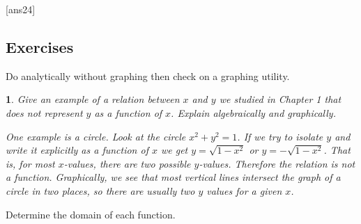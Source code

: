 \documentclass{amsbook}
\newtheorem{exc}{}
\newenvironment{ex}{\begin{exc}\normalfont}{\end{exc}}
\numberwithin{section}{chapter}
\numberwithin{equation}{chapter}
\begin{document}
[ans24]
\subsection*{Exercises \nopunct} Do analytically without graphing then check on a graphing utility.\hfill

\begin{ex}
	Give an example of a relation between $x$ and $y$ we studied in Chapter 1 that does not represent $y$ as a function of $x$. Explain algebraically and graphically.
	\begin{sol}
		One example is a circle. Look at the circle $x^2+y^2=1$. If we try to isolate $y$ and write it explicitly as a function of $x$ we get $y=\sqrt{1-x^2}$ or $y=-\sqrt{1-x^2}$. That is, for most $x$-values, there are two possible $y$-values. Therefore the relation is not a function. Graphically, we see that most vertical lines intersect the graph of a circle in two places, so there are usually two $y$ values for a given $x$.
	\end{sol}
\end{ex}

Determine the domain of each function.
\end{document}
